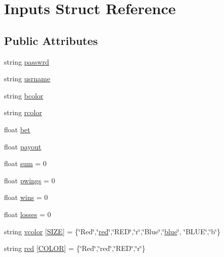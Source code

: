 \hypertarget{struct_inputs}{}\section{Inputs Struct Reference}
\label{struct_inputs}
\subsection*{Public Attributes}
\begin{DoxyCompactItemize}
\item 
string \hyperlink{struct_inputs_a8c55eda886194176c889c08a30a669a6}{passwrd}
\item 
string \hyperlink{struct_inputs_a890a399e0575f0ab410e101f3748d04a}{usrname}
\item 
string \hyperlink{struct_inputs_a7a35f3dd65cc7f24cd3e4940bd36fa74}{bcolor}
\item 
string \hyperlink{struct_inputs_a3b8bbe1d2d8f1736d88f6130e800ac16}{rcolor}
\item 
float \hyperlink{struct_inputs_af2dd0562ce671279d010f1f6c927e719}{bet}
\item 
float \hyperlink{struct_inputs_ae019de875b0b547d9f6ff125068762c0}{payout}
\item 
float \hyperlink{struct_inputs_ab43ee7fc7282e8dadf5ae6d40453ccda}{sum} = 0
\item 
float \hyperlink{struct_inputs_a3ec027582343b553787b0e956a84bfae}{pwings} = 0
\item 
float \hyperlink{struct_inputs_a29b8137642d1269f9ef32b785200c17c}{wins} = 0
\item 
float \hyperlink{struct_inputs_a55580df8b5ddf655fc8f144ac1037863}{losses} = 0
\item 
string \hyperlink{struct_inputs_a80018d9bf94a9c6ea573b93ed30f89a6}{vcolor} \mbox{[}\hyperlink{main_8cpp_af08413a3ee12cf78b0ddeea71e2648b3}{S\+I\+ZE}\mbox{]} = \{\char`\"{}Red\char`\"{},\char`\"{}\hyperlink{struct_inputs_a7e6f084b57b2515a6d260d422b252f37}{red}\char`\"{},\char`\"{}R\+ED\char`\"{},\char`\"{}r\char`\"{},\char`\"{}Blue\char`\"{},\char`\"{}\hyperlink{struct_inputs_a685a6f5b41c965ecc2ff5ede529649da}{blue}\char`\"{}, \char`\"{}B\+L\+UE\char`\"{},\char`\"{}b\char`\"{}\}
\item 
string \hyperlink{struct_inputs_a7e6f084b57b2515a6d260d422b252f37}{red} \mbox{[}\hyperlink{main_8cpp_aa6d8034c897057de595a4511a4e7a837}{C\+O\+L\+OR}\mbox{]} = \{\char`\"{}Red\char`\"{},\char`\"{}red\char`\"{},\char`\"{}R\+ED\char`\"{},\char`\"{}r\char`\"{}\}
\item 

\end{DoxyCompactItemize}
